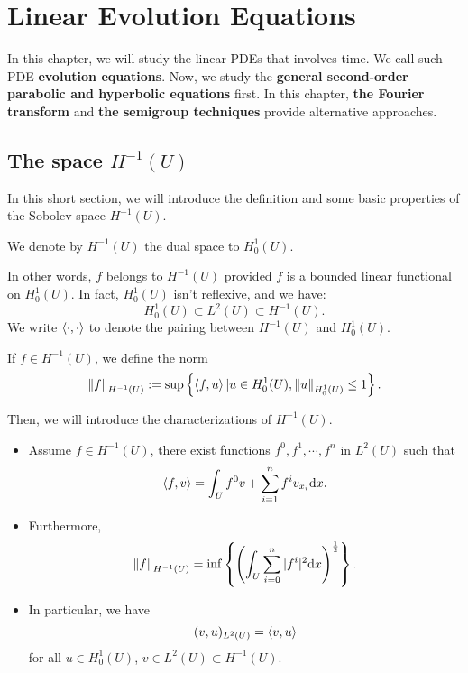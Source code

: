 \chapter{Linear Evolution Equations}
In this chapter, we will study the linear PDEs that involves time. We call such PDE \textbf{evolution equations}. Now, we study the \textbf{general second-order parabolic and hyperbolic equations} first. In this chapter, \textbf{the Fourier transform} and \textbf{the semigroup techniques} provide alternative approaches.
\section{The space $H^{-1}(U)$}
In this short section, we will introduce the definition and some basic properties of the Sobolev space $H^{-1}(U)$. 
\begin{definition}
    We denote by $H^{-1}(U)$ the dual space to $H_{0}^{1}(U)$.
\end{definition}
In other words, $f$ belongs to $H^{-1}(U)$ provided $f$ is a bounded linear functional on $H_{0}^{1}(U)$. In fact, $H_{0}^{1}(U)$ isn't reflexive, and we have:
\begin{equation}
    H_{0}^{1}(U)\subset L^{2}(U)\subset H^{-1}(U).
\end{equation}
We write $\left<\cdot,\cdot\right>$ to denote the pairing between $H^{-1}(U)$ and $H_{0}^{1}(U)$.
\begin{definition}
    If $f\in H^{-1}(U)$, we define the norm 
    \begin{equation}
        \left\|f\right\|_{H^{-1}(U)}:=\sup\left\{\left<f,u\right>|u\in H_{0}^{1}(U),\left\|u\right\|_{H_{0}^{1}(U)}\le 1\right\}.
    \end{equation}
\end{definition}
Then, we will introduce the characterizations of $H^{-1}(U)$.
\begin{theorem}[characterization of $H^{-1}$]
\begin{itemize}
    \item Assume $f\in H^{-1}(U)$, there exist functions $f^{0},f^{1},\cdots,f^{n}$ in $L^{2}(U)$ such that 
    \begin{equation}
        \left<f,v\right>=\int_{U}f^{0}v+\sum_{i=1}^{n}f^{i}v_{x_{i}}\mathrm{d} x.
    \end{equation}
    \item Furthermore,
    \begin{equation}
        \left\|f\right\|_{H^{-1}(U)}=\inf\left\{\left(\int_{U}\sum_{i=0}^{n}|f^{i}|^{2}\mathrm{d} x\right)^{\frac{1}{2}}\right\}.
    \end{equation}
    \item In particular, we have
    \begin{equation}
        (v,u)_{L^{2}(U)}=\left<v,u\right>
    \end{equation}
    for all $u\in H_{0}^{1}(U)$, $v\in L^{2}(U)\subset H^{-1}(U)$.
\end{itemize}
\end{theorem}

